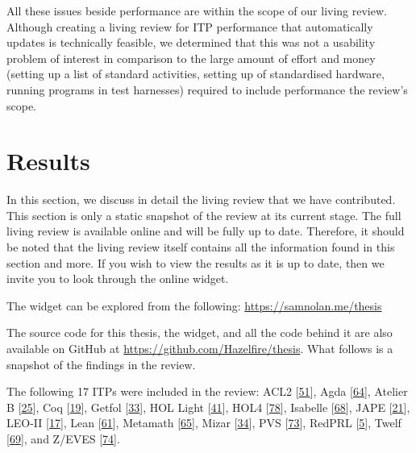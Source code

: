 \documentclass[
]{article}
\begin{document}
All these issues beside performance are within the scope of our living
review. Although creating a living review for ITP performance that
automatically updates is technically feasible, we determined that this
was not a usability problem of interest in comparison to the large
amount of effort and money (setting up a list of standard activities,
setting up of standardised hardware, running programs in test harnesses)
required to include performance the review's scope.

\hypertarget{sec:results}{%
\section{Results}\label{sec:results}}

In this section, we discuss in detail the living review that we have
contributed. This section is only a static snapshot of the review at its
current stage. The full living review is available online and will be
fully up to date. Therefore, it should be noted that the living review
itself contains all the information found in this section and more. If
you wish to view the results as it is up to date, then we invite you to
look through the online widget.

The widget can be explored from the following:
\href{https://samnolan.me/thesis/review.html}{https://samnolan.me/thesis}

The source code for this thesis, the widget, and all the code behind it
are also available on GitHub at
\url{https://github.com/Hazelfire/thesis}. What follows is a snapshot of
the findings in the review.

The following 17 ITPs were included in the review: ACL2
{[}\protect\hyperlink{ref-ACL2}{51}{]}, Agda
{[}\protect\hyperlink{ref-Agda}{64}{]}, Atelier B
{[}\protect\hyperlink{ref-Atelier_B}{25}{]}, Coq
{[}\protect\hyperlink{ref-Coq}{19}{]}, Getfol
{[}\protect\hyperlink{ref-Getfol}{33}{]}, HOL Light
{[}\protect\hyperlink{ref-HOL_Light}{41}{]}, HOL4
{[}\protect\hyperlink{ref-HOL4}{78}{]}, Isabelle
{[}\protect\hyperlink{ref-Isabelle}{68}{]}, JAPE
{[}\protect\hyperlink{ref-JAPE}{21}{]}, LEO-II
{[}\protect\hyperlink{ref-LEO-II}{17}{]}, Lean
{[}\protect\hyperlink{ref-Lean}{61}{]}, Metamath
{[}\protect\hyperlink{ref-Metamath}{65}{]}, Mizar
{[}\protect\hyperlink{ref-Mizar}{34}{]}, PVS
{[}\protect\hyperlink{ref-PVS}{73}{]}, RedPRL
{[}\protect\hyperlink{ref-RedPRL}{5}{]}, Twelf
{[}\protect\hyperlink{ref-Twelf}{69}{]}, and Z/EVES
{[}\protect\hyperlink{ref-Zux2fEVES}{74}{]}.
\end{document}
